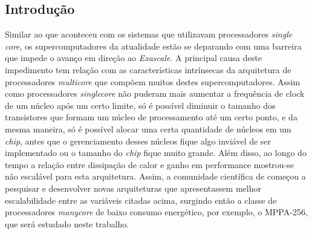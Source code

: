 \begin{resumo}[Resumo Estendido]
\section*{Introdução} %

Similar ao que aconteceu com os sistemas que utilizavam processadores \textit{single core}, os supercomputadores da atualidade estão se deparando com uma barreira que impede o avanço em direção ao \textit{Exascale}. A principal causa deste impedimento tem relação com as características intrínsecas da arquitetura de processadores \textit{multicore} que compõem muitos destes supercomputadores. Assim como processadores \textit{singlecore} não puderam mais aumentar a frequência de clock de um núcleo após um certo limite, só é possível diminuir o tamanho dos transistores que formam um núcleo de processamento até um certo ponto, e da mesma maneira, só é possível alocar uma certa quantidade de núcleos em um \textit{chip}, antes que o gerenciamento desses núcleos fique algo inviável de ser implementado ou o tamanho do \textit{chip} fique muito grande. Além disso, ao longo do tempo a relação entre dissipação de calor e ganho em performance mostrou-se não escalável para esta arquitetura. Assim, a comunidade científica de \HPC começou a pesquisar e desenvolver novas arquiteturas que apresentassem melhor escalabilidade entre as variáveis citadas acima, surgindo então a classe de processadores \textit{manycore} de baixo consumo energético, por exemplo, o MPPA-256, que será estudado neste trabalho.


\end{resumo}

